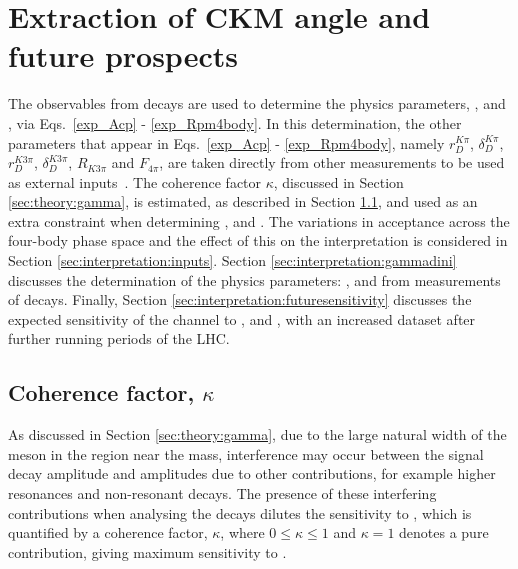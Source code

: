 \clearpage
%

\chapter{\label{ch:6-interpretation}Extraction of CKM angle \Pgamma and future prospects} 


The \CP observables from \btodkst decays are used to determine the physics parameters, \rb, \deltab and \Pgamma, via Eqs.~\ref{exp_Acp} - \ref{exp_Rpm4body}. In this determination, the other parameters that appear in Eqs.~\ref{exp_Acp} - \ref{exp_Rpm4body}, namely $r_D^{K\pi}$, $\delta_D^{K\pi}$, $r_D^{K3\pi}$, $\delta_D^{K3\pi}$, $R_{K3\pi}$ and $F_{4\pi}$, are taken directly from other measurements to be used as external inputs~\cite{HFAG,charmk3pi,charmk3pi_errata,charm4pi}. The coherence factor $\kappa$, discussed in Section \ref{sec:theory:gamma}, is estimated, as described in Section \ref{sec:interpretation:coherence}, and used as an extra constraint when determining \rb, \deltab and \Pgamma. The variations in acceptance across the four-body phase space and the effect of this on the interpretation is considered in Section \ref{sec:interpretation:inputs}. Section \ref{sec:interpretation:gammadini} discusses the determination of the physics parameters: \rb, \deltab and \Pgamma from measurements of \btodkst decays. Finally, Section \ref{sec:interpretation:futuresensitivity} discusses the expected sensitivity of the \btodkst channel to \rb, \deltab and \Pgamma, with an increased dataset after further running periods of the LHC.

\section{Coherence factor, $\kappa$}
\label{sec:interpretation:coherence}

As discussed in Section \ref{sec:theory:gamma}, due to the large natural width of the \Kstarm meson in the region near the \Kstarm mass, interference may occur between the signal \Kstarm decay amplitude and amplitudes due to other \decay{\Bm}{\D\KS\pim} contributions, for example higher \KS\pim resonances and non-resonant decays. The presence of these interfering contributions when analysing the \btodkst decays dilutes the sensitivity to \Pgamma, which is quantified by a coherence factor, $\kappa$, where $0 \leq \kappa \leq 1$ and $\kappa = 1$ denotes a pure \Kstarm contribution, giving maximum sensitivity to \Pgamma. 

